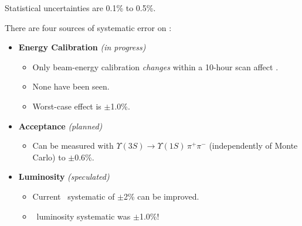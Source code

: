 \begin{slide*}
\slideframe{}
\begin{minipage}[t]{\linewidth}
\Large

\vspace{0.25cm}

{\LARGE Statistical uncertainties are 0.1\% to 0.5\%.}

\vspace{0.75cm}

{\LARGE There are four sources of systematic error on \gamee:}

\begin{itemize}

  \item {\LARGE {\bf Energy Calibration} {\it (in progress)}}
    \begin{itemize}

      \item Only beam-energy calibration {\it changes} within
	a 10-hour scan affect \gamee.

      \item None have been seen.

      \item Worst-case effect is $\pm$1.0\%.

    \end{itemize}

  \vspace{0.2cm}

  \item {\LARGE {\bf Acceptance} {\it (planned)}}
    \begin{itemize}
      
      \item Can be measured with $\Upsilon(3S) \to \Upsilon(1S)\, \pi^+ \pi^-$
	(independently of Monte Carlo) to $\pm$0.6\%.

    \end{itemize}

  \vspace{0.2cm}

  \item {\LARGE {\bf Luminosity} {\it (speculated)}}
    \begin{itemize}

      \item Current \cleoiii\ systematic of $\pm$2\% can be improved.

      \item \cleoii\ luminosity systematic was $\pm$1.0\%!


\end{itemize}
\end{itemize}
\end{minipage}
\end{slide*}
